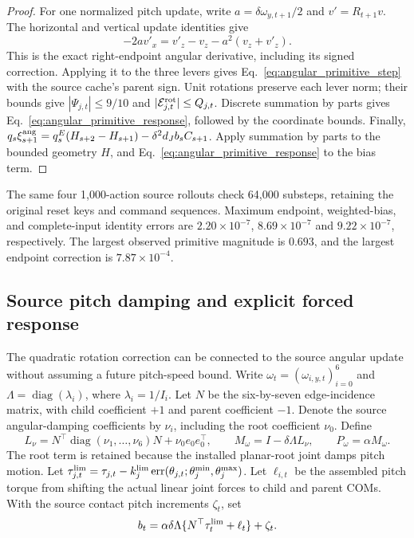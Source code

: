 \begin{proof}
For one normalized pitch update, write $a=\delta\omega_{y,t+1}/2$ and $v'=R_{t+1}v$.
The horizontal and vertical update identities give
\begin{equation}
 -2av'_x=v'_z-v_z-a^2(v_z+v'_z).
\end{equation}
This is the exact right-endpoint angular derivative, including its signed correction.
Applying it to the three levers gives Eq.~\eqref{eq:angular_primitive_step} with the source cache's parent sign.
Unit rotations preserve each lever norm; their bounds give $|\Psi_{j,t}|\le9/10$ and $|\mathcal E^{\rm rot}_{j,t}|\le Q_{j,t}$.
Discrete summation by parts gives Eq.~\eqref{eq:angular_primitive_response}, followed by the coordinate bounds.
Finally, $q_s\xi_{s+1}^{\rm ang}=q_s^E(H_{s+2}-H_{s+1})-\delta^2d_Jb_sC_{s+1}$.
Apply summation by parts to the bounded geometry $H$, and Eq.~\eqref{eq:angular_primitive_response} to the bias term.
\end{proof}

The same four 1,000-action source rollouts check 64,000 substeps, retaining the original reset keys and command sequences.
Maximum endpoint, weighted-bias, and complete-input identity errors are $2.20\times10^{-7}$, $8.69\times10^{-7}$ and $9.22\times10^{-7}$, respectively.
The largest observed primitive magnitude is $0.693$, and the largest endpoint correction is $7.87\times10^{-4}$.

\subsection{Source pitch damping and explicit forced response}
\label{app:pitch_damping}

The quadratic rotation correction can be connected to the source angular update without assuming a future pitch-speed bound.
Write $\omega_t=(\omega_{i,y,t})_{i=0}^6$ and $\Lambda=\operatorname{diag}(\lambda_i)$, where $\lambda_i=1/I_i$.
Let $N$ be the six-by-seven edge-incidence matrix, with child coefficient $+1$ and parent coefficient $-1$.
Denote the source angular-damping coefficients by $\nu_i$, including the root coefficient $\nu_0$.
Define
\begin{equation}
 L_\nu=N^\top\operatorname{diag}(\nu_1,\ldots,\nu_6)N+\nu_0 e_0e_0^\top,
 \qquad M_\omega=I-\delta\Lambda L_\nu,
 \qquad P_\omega=\alpha M_\omega.
\end{equation}
The root term is retained because the installed planar-root joint damps pitch motion.
Let $\tau^{\rm lim}_{j,t}=\tau_{j,t}-k_j^{\rm lim}\operatorname{err}(\theta_{j,t};\theta_j^{\min},\theta_j^{\max})$.
Let $\ell_{i,t}$ be the assembled pitch torque from shifting the actual linear joint forces to child and parent COMs.
With the source contact pitch increments $\zeta_t$, set
\begin{equation}
 b_t=\alpha\delta\Lambda\{N^\top\tau_t^{\rm lim}+\ell_t\}+\zeta_t.
 \label{eq:pitch_source_input}
\end{equation}

